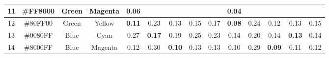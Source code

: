 \begin{table}[!htbp]
{\begin{tabular}{@{}cccccccccccccc@{}}
    \multicolumn{1}{c}{11}      & \multicolumn{1}{c}{\cellcolor[HTML]{FF8000}\#FF8000} & \multicolumn{1}{c|}{Green}   & \multicolumn{1}{c|}{Magenta} & \multicolumn{1}{c|}{\cellcolor[HTML]{32CB00}\textbf{0.06}}  & \multicolumn{4}{c||}{}                                                                                                                                                                                             & \multicolumn{1}{c|}{\cellcolor[HTML]{32CB00}\textbf{0.04}} & \multicolumn{4}{c|}{}                                                                                                                                                                                                                             \\ \midrule
    \multicolumn{1}{c}{12}      & \multicolumn{1}{c}{\cellcolor[HTML]{80FF00}\#80FF00} & \multicolumn{1}{c|}{Green}   & \multicolumn{1}{c|}{Yellow}  & \multicolumn{1}{c|}{\cellcolor[HTML]{32CB00}\textbf{0.11}}  & \multicolumn{1}{c|}{0.23}                                  & \multicolumn{1}{c|}{0.13}                                  & \multicolumn{1}{c|}{0.15}  & \multicolumn{1}{c||}{0.17}                                  & \multicolumn{1}{c|}{\cellcolor[HTML]{32CB00}\textbf{0.08}} & \multicolumn{1}{c|}{0.24}                                  & \multicolumn{1}{c|}{0.12}                                  & \multicolumn{1}{c|}{0.13}                                  & \multicolumn{1}{c|}{0.15}                                  \\ \midrule
    \multicolumn{1}{c}{13}      & \multicolumn{1}{c}{\cellcolor[HTML]{0080FF}\#0080FF} & \multicolumn{1}{c|}{Blue}    & \multicolumn{1}{c|}{Cyan}    & \multicolumn{1}{c|}{0.27}                                   & \multicolumn{1}{c|}{\cellcolor[HTML]{32CB00}\textbf{0.17}} & \multicolumn{1}{c|}{0.19}                                  & \multicolumn{1}{c|}{0.25}  & \multicolumn{1}{c||}{0.23}                                  & \multicolumn{1}{c|}{0.14}                                  & \multicolumn{1}{c|}{0.20}                                  & \multicolumn{1}{c|}{0.14}                                  & \multicolumn{1}{c|}{\cellcolor[HTML]{32CB00}\textbf{0.13}} & \multicolumn{1}{c|}{0.14}                                  \\ \midrule
    \multicolumn{1}{c}{14}      & \multicolumn{1}{c}{\cellcolor[HTML]{8000FF}\#8000FF} & \multicolumn{1}{c|}{Blue}    & \multicolumn{1}{c|}{Magenta} & \multicolumn{1}{c|}{0.12}                                   & \multicolumn{1}{c|}{0.30}                                  & \multicolumn{1}{c|}{\cellcolor[HTML]{32CB00}\textbf{0.10}} & \multicolumn{1}{c|}{0.13}  & \multicolumn{1}{c||}{0.13}                                  & \multicolumn{1}{c|}{0.10}                                  & \multicolumn{1}{c|}{0.29}                                  & \multicolumn{1}{c|}{\cellcolor[HTML]{32CB00}\textbf{0.09}} & \multicolumn{1}{c|}{0.11}                                  & \multicolumn{1}{c|}{0.12}                                  \\ \midrule

\end{tabular}}
\end{table}
